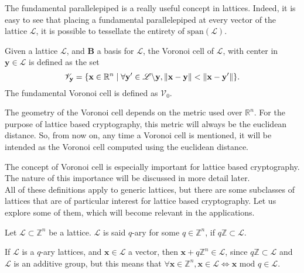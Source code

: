 \begin{remark}
The fundamental parallelepiped is a really useful concept in lattices. Indeed, it is easy to see that placing a fundamental parallelepiped at every vector of the lattice $\mathscr{L}$, it is possible to tessellate the entirety of $\mathrm{span}(\mathscr{L})$.
\end{remark}

\begin{definition}
Given a lattice $\mathscr{L}$, and $\mathbf{B}$ a basis for $\mathscr{L}$, the Voronoi cell of $\mathscr{L}$, with center in $\mathbf{y}\in\mathscr{L}$ is defined as the set
\begin{equation*}
\mathscr{V}_\mathbf{y} = \{\mathbf{x}\in\mathbb{R}^n\mid\forall \mathbf{y}' \in \mathscr{L}\backslash\mathbf{y}, \left\lVert \mathbf{x}-\mathbf{y} \right\rVert < \left\lVert \mathbf{x}-\mathbf{y}' \right\rVert \}.
\end{equation*}
The fundamental Voronoi cell is defined as $\mathscr{V}_0$. 
\end{definition}

\begin{remark}
The geometry of the Voronoi cell depends on the metric used over $\mathbb{R}^n$. For the purpose of lattice based cryptography, this metric will always be the euclidean distance. So, from now on, any time a Voronoi cell is mentioned, it will be intended as the Voronoi cell computed using the euclidean distance.
\end{remark}

The concept of Voronoi cell is especially important for lattice based cryptography. The nature of this importance will be discussed in more detail later.\\
All of these definitions apply to generic lattices, but there are some subclasses of lattices that are of particular interest for lattice based cryptography. Let us explore some of them, which will become relevant in the applications.

\begin{definition}
Let $\mathscr{L}\subset\mathbb{Z}^n$ be a lattice. $\mathscr{L}$ is said $q$-ary for some $q\in\mathbb{Z}^n$, if $q\mathbb{Z}\subset\mathscr{L}$.
\end{definition} 

\begin{remark}
If $\mathscr{L}$ is a $q$-ary lattices, and $\mathbf{x}\in\mathscr{L}$ a vector, then $\mathbf{x}+q\mathbb{Z}^n\in\mathscr{L}$, since $q\mathbb{Z}\subset\mathscr{L}$ and $\mathscr{L}$ is an additive group, but this means that $\forall\mathbf{x}\in\mathbb{Z}^n, \mathbf{x}\in\mathscr{L}\Leftrightarrow\mathbf{x}$ $\mathrm{mod}$ $q\in\mathscr{L}$.
\end{remark}

